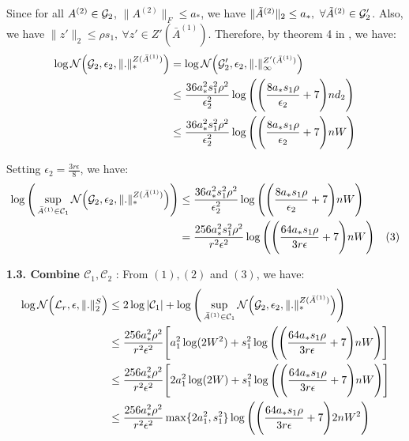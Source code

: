 \noindent Since for all $A^{(2)}\in \mathcal{G}_2$, $\|A^{(2)}\|_F\le a_*$, we have $\|\tilde A^{(2)}\|_2\le a_*, \ \forall \tilde A^{(2)} \in \G_2'$. Also, we have $\|z'\|_2\le \rho s_1, \ \forall z'\in Z'(\bar A^{(1)})$. Therefore, by theorem 4 in \cite{article:tong_zhang}, we have:
\begin{align*}
    \log\mathcal{N}\Big( \mathcal{G}_2, \epsilon_2, \|.\|_*^{Z(\bar A^{(1)})} \Big) &= \log\mathcal{N}\Big( \mathcal{G}_2', \epsilon_2, \|.\|_\infty^{Z'(\bar A^{(1)})} \Big) \\
        &\le \frac{36a_*^2s_1^2\rho^2}{\epsilon_2^2} \log\Bigg( 
            \Bigg( 
                \frac{8a_*s_1\rho}{\epsilon_2} + 7
             \Bigg)nd_2
         \Bigg) \\
        &\le \frac{36a_*^2s_1^2\rho^2}{\epsilon_2^2} \log\Bigg( 
            \Bigg( 
                \frac{8a_*s_1\rho}{\epsilon_2} + 7
             \Bigg)nW
         \Bigg)
\end{align*}
        
\noindent Setting $\epsilon_2 = \frac{3r\epsilon}{8}$, we have:
\begin{align*}
    \log\Bigg( 
        \sup_{\bar A^{(1)} \in \mathcal{C}_1} \mathcal{N}\Big( \mathcal{G}_2, \epsilon_2, \|.\|_*^{Z(\bar A^{(1)})} \Big)
     \Bigg) &\le \frac{36a_*^2s_1^2\rho^2}{\epsilon_2^2} \log\Bigg( 
        \Bigg( 
            \frac{8a_*s_1\rho}{\epsilon_2} + 7
         \Bigg)nW
     \Bigg) \\
    &= \frac{256a_*^2s_1^2\rho^2}{r^2\epsilon^2} \log\Bigg( 
        \Bigg( 
            \frac{64a_*s_1\rho}{3r\epsilon} + 7
         \Bigg)nW
     \Bigg) \ \ \ (3)
\end{align*}

\noindent\newline\textbf{1.3. Combine $\mathcal{C}_1, \mathcal{C}_2$} : From $(1), (2)$ and $(3)$, we have:
\begin{align*}
    \log\mathcal{N}\Big( \mathcal{L}_r, \epsilon, \|.\|_2^S \Big) &\le 2\log|\mathcal{C}_1| + \log\Bigg( 
        \sup_{\bar A^{(1)} \in \mathcal{C}_1} \mathcal{N}\Big( \mathcal{G}_2, \epsilon_2, \|.\|_*^{Z(\bar A^{(1)})} \Big)
     \Bigg) \\
    &\le \frac{256a_*^2\rho^2}{r^2\epsilon^2}\Bigg[ 
        a_1^2\log(2W^2) + s_1^2\log\Bigg( \Bigg( 
            \frac{64a_*s_1\rho}{3r\epsilon} + 7
         \Bigg)nW \Bigg)
     \Bigg] \\
    &\le \frac{256a_*^2\rho^2}{r^2\epsilon^2}\Bigg[ 
        2a_1^2\log(2W) + s_1^2\log\Bigg( \Bigg( 
            \frac{64a_*s_1\rho}{3r\epsilon} + 7
         \Bigg)nW \Bigg)
     \Bigg] \\
    &\le \frac{256a_*^2\rho^2}{r^2\epsilon^2}\max\{2a_1^2, s_1^2\} \log\Bigg( 
        \Bigg( 
            \frac{64a_*s_1\rho}{3r\epsilon} + 7
         \Bigg)2nW^2
     \Bigg)
\end{align*}



